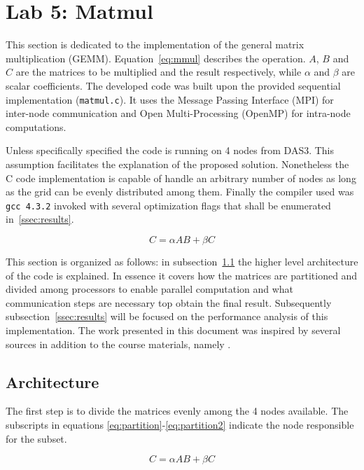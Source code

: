 \section{Lab 5: Matmul}

This section is dedicated to the implementation of the general matrix multiplication (GEMM). Equation~\ref{eq:mmul} describes the operation.
$A$, $B$ and $C$ are the matrices to be multiplied and the result respectively, while $\alpha$ and $\beta$ are scalar coefficients. 
The developed code was built upon the provided sequential implementation (\texttt{matmul.c}).
It uses the Message Passing Interface (MPI) for inter-node communication and Open Multi-Processing (OpenMP) for intra-node computations.

Unless specifically specified the code is running on 4 nodes from DAS3. This assumption facilitates the explanation of the proposed solution.
Nonetheless the C code implementation is capable of handle an arbitrary number of nodes as long as the grid can be evenly distributed among them.
Finally the compiler used was \texttt{gcc 4.3.2} invoked with several optimization flags that shall be enumerated in~\ref{ssec:results}.


\begin{equation}
C = \alpha AB + \beta C
\label{eq:mmul}
\end{equation}

This section is organized as follows: in subsection~\ref{ssec:arch} the higher level architecture of the code is explained.
In essence it covers how the matrices are partitioned and divided among processors to enable parallel computation and what communication steps are necessary top obtain the final result.
Subsequently subsection~\ref{ssec:results} will be focused on the performance analysis of this implementation.
The work presented in this document was inspired by several sources in addition to the course materials, namely \cite{sandeep, ortega, chien}.

\subsection{Architecture}
\label{ssec:arch}

The first step is to divide the matrices evenly among the 4 nodes available.
The subscripts in equations \ref{eq:partition}-\ref{eq:partition2} indicate the node responsible for the subset. 

\begin{equation}
C = \alpha AB + \beta C
\label{eq:mainproblem}
\end{equation}

